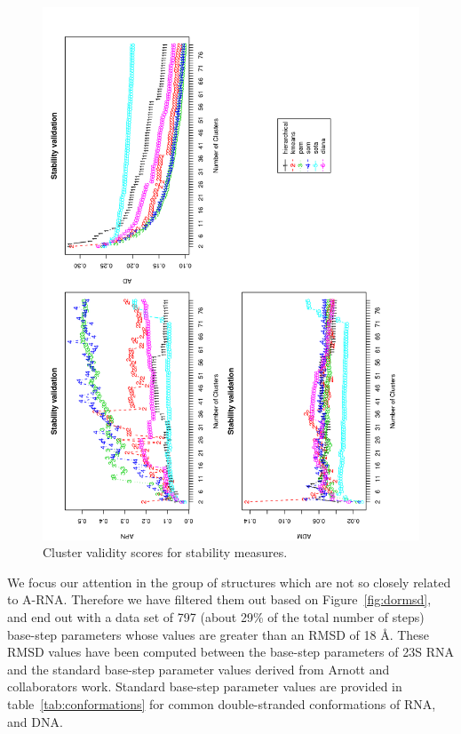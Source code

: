 \begin{figure}
 \centering
\includegraphics[angle=0, scale=0.38]{Chapter2/STval_sta.png}
\caption{Cluster validity scores for stability measures.}
 \label{fig:stability}
\end{figure}

We focus  our attention in  the group of  structures which are  not so
closely related to A-RNA. Therefore we have filtered them out based on
Figure~\ref{fig:dormsd}, and end out with a data set of 797 (about 29\%
of the  total number of  steps) base-step parameters whose  values are
greater than an RMSD of 18  \AA.  These RMSD values have been computed
between the base-step parameters of 23S RNA and the standard base-step
parameter    values   derived    from    Arnott   and    collaborators
\cite{arnott1973} work. Standard base-step parameter values are provided in 
table~\ref{tab:conformations} for common double-stranded conformations
of RNA, and DNA.

